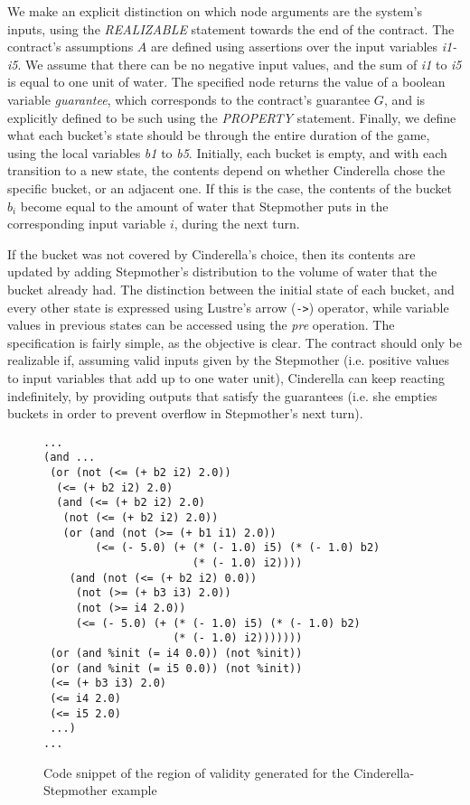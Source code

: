 We make an explicit distinction on which node arguments are the system's inputs, using the \textit{REALIZABLE} statement towards the end of the contract. The contract's
assumptions $A$ are defined using assertions over the input variables
\textit{i1-i5}. We assume that there can be no negative input values, and the
sum of \textit{i1} to \textit{i5} is equal to one unit of water. The specified node
returns the value of a boolean variable \textit{guarantee}, which corresponds to
the contract's guarantee $G$, and is explicitly defined to be such using the
\textit{PROPERTY} statement. Finally, we define what each bucket's state should be through the entire
duration of the game, using the local variables \textit{b1} to \textit{b5}.
Initially, each bucket is empty, and with each transition to a new state, the contents depend on
whether Cinderella chose the specific bucket, or an adjacent one. If this is the
case, the contents of the bucket $b_i$ become equal to the amount of water that
Stepmother puts in the corresponding input variable $i$, during the next turn.

If the bucket was not covered by Cinderella's choice, then its contents are
updated by adding Stepmother's distribution to the volume of water that the
bucket already had. The distinction between the initial state of each bucket,
and every other state is expressed using Lustre's arrow (\texttt{->})
operator, while variable values in previous states can be accessed using the
\textit{pre} operation.
The specification is fairly simple, as the objective is clear. The contract
should only be realizable if, assuming valid inputs given by the Stepmother
(i.e. positive values to input variables that add up to one water unit),
Cinderella can keep reacting indefinitely, by providing outputs that satisfy the
guarantees (i.e. she empties buckets in order to prevent overflow in Stepmother's next turn).

\begin{figure}[!t]
\centering
 \begin{Verbatim}[fontsize=\footnotesize]
...
(and ...
 (or (not (<= (+ b2 i2) 2.0))
  (<= (+ b2 i2) 2.0)
  (and (<= (+ b2 i2) 2.0)
   (not (<= (+ b2 i2) 2.0))
   (or (and (not (>= (+ b1 i1) 2.0))
        (<= (- 5.0) (+ (* (- 1.0) i5) (* (- 1.0) b2)
                       (* (- 1.0) i2))))
    (and (not (<= (+ b2 i2) 0.0))
     (not (>= (+ b3 i3) 2.0))
     (not (>= i4 2.0))
     (<= (- 5.0) (+ (* (- 1.0) i5) (* (- 1.0) b2)
                    (* (- 1.0) i2)))))))
 (or (and %init (= i4 0.0)) (not %init))
 (or (and %init (= i5 0.0)) (not %init))
 (<= (+ b3 i3) 2.0)
 (<= i4 2.0)
 (<= i5 2.0)
 ...)
...
 \end{Verbatim}
\caption{Code snippet of the region of validity generated for the Cinderella-Stepmother
example}
\label{fg:snippet}
\end{figure}

